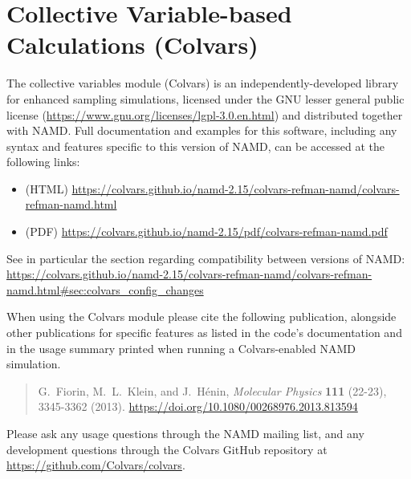 \section{Collective Variable-based Calculations (Colvars)}
\label{section:colvars}

The collective variables module (Colvars) is an independently-developed library for enhanced sampling simulations, licensed under the GNU lesser general public license (\url{https://www.gnu.org/licenses/lgpl-3.0.en.html}) and distributed together with NAMD.
Full documentation and examples for this software, including any syntax and features specific to this version of NAMD, can be accessed at the following links:
\begin{itemize}
\item (HTML) \url{https://colvars.github.io/namd-2.15/colvars-refman-namd/colvars-refman-namd.html}
\item (PDF) \url{https://colvars.github.io/namd-2.15/pdf/colvars-refman-namd.pdf}
\end{itemize}
\noindent{}See in particular the section regarding compatibility between versions of NAMD:\\
\url{https://colvars.github.io/namd-2.15/colvars-refman-namd/colvars-refman-namd.html#sec:colvars_config_changes}

When using the Colvars module please cite the following publication, alongside other publications for specific features as listed in the code's documentation and in the usage summary printed when running a Colvars-enabled NAMD simulation.

\begin{quote}
  G.\ Fiorin, M.\ L.\ Klein, and J.\ H\'enin, {\it Molecular Physics} {\bf 111} (22-23), 3345-3362 (2013). \url{https://doi.org/10.1080/00268976.2013.813594}
\end{quote}

Please ask any usage questions through the NAMD mailing list, and any development questions through the Colvars GitHub repository at \url{https://github.com/Colvars/colvars}.
